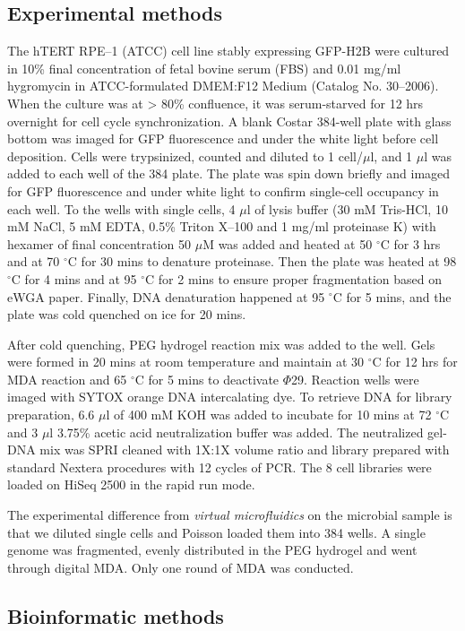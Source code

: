 \subsection{Experimental methods}
The hTERT RPE--1 (ATCC) cell line stably expressing GFP-H2B were cultured in 10\% final concentration of fetal bovine serum (FBS) and 0.01 mg\slash ml hygromycin in ATCC-formulated DMEM:F12 Medium (Catalog No. 30--2006). When the culture was at > 80\% confluence, it was serum-starved for 12 hrs overnight for cell cycle synchronization. A blank Costar 384-well plate with glass bottom was imaged for GFP fluorescence and under the white light before cell deposition. Cells were trypsinized, counted and diluted to 1 cell\slash $\mu$l, and 1 $\mu$l was added to each well of the 384 plate. The plate was spin down briefly and imaged for GFP fluorescence and under white light to confirm single-cell occupancy in each well. To the wells with single cells, 4 $\mu$l of lysis buffer (30 mM Tris-HCl, 10 mM NaCl, 5 mM EDTA, 0.5\% Triton X--100 and 1 mg\slash ml proteinase K) with hexamer of final concentration 50 $\mu$M was added and heated at 50 $^{\circ}$C for 3 hrs and at 70 $^{\circ}$C for 30 mins to denature proteinase. Then the plate was heated at 98 $^{\circ}$C for 4 mins and at 95 $^{\circ}$C for 2 mins to ensure proper fragmentation based on eWGA paper. Finally, DNA denaturation happened at 95 $^{\circ}$C for 5 mins, and the plate was cold quenched on ice for 20 mins. 

After cold quenching, PEG hydrogel reaction mix was added to the well. Gels were formed in 20 mins at room temperature and maintain at 30 $^{\circ}$C for 12 hrs for MDA reaction and 65 $^{\circ}$C for 5 mins to deactivate $\Phi$29. Reaction wells were imaged with SYTOX orange DNA intercalating dye. To retrieve DNA for library preparation, 6.6 $\mu$l of 400 mM KOH was added to incubate for 10 mins at 72 $^{\circ}$C and 3 $\mu$l 3.75\% acetic acid neutralization buffer was added. The neutralized gel-DNA mix was SPRI cleaned with 1X:1X volume ratio and library prepared with standard Nextera procedures with 12 cycles of PCR. The 8 cell libraries were loaded on HiSeq 2500 in the rapid run mode. 

The experimental difference from \textit{virtual microfluidics} on the microbial sample is that we diluted single cells and Poisson loaded them into 384 wells. A single genome was fragmented, evenly distributed in the PEG hydrogel and went through digital MDA. Only one round of MDA was conducted. 

\subsection{Bioinformatic methods}

